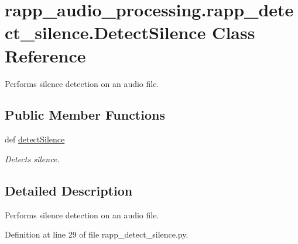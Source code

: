 \hypertarget{classrapp__audio__processing_1_1rapp__detect__silence_1_1DetectSilence}{\section{rapp\-\_\-audio\-\_\-processing.\-rapp\-\_\-detect\-\_\-silence.\-Detect\-Silence Class Reference}
\label{classrapp__audio__processing_1_1rapp__detect__silence_1_1DetectSilence}
}


Performs silence detection on an audio file.  


\subsection*{Public Member Functions}
\begin{DoxyCompactItemize}
\item 
def \hyperlink{classrapp__audio__processing_1_1rapp__detect__silence_1_1DetectSilence_a873f771baa016361139e37e7c49d4b48}{detect\-Silence}
\begin{DoxyCompactList}\small\item\em Detects silence. \end{DoxyCompactList}\end{DoxyCompactItemize}


\subsection{Detailed Description}
Performs silence detection on an audio file. 

Definition at line 29 of file rapp\-\_\-detect\-\_\-silence.\-py.



